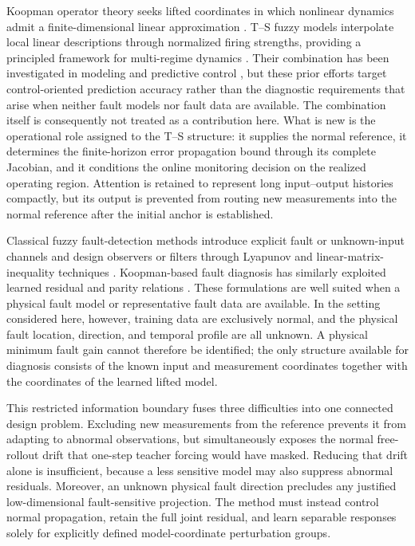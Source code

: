 \documentclass[journal]{IEEEtran}
\newcommand{\1}{\bm 1}
\begin{document}
Koopman operator theory seeks lifted coordinates in which nonlinear dynamics
admit a finite-dimensional linear approximation
\cite{brunton2016,lusch2018}. T--S fuzzy models interpolate local linear
descriptions through normalized firing strengths, providing a principled
framework for multi-regime dynamics \cite{takagi1985,tanaka2001,lam2018}.
Their combination has been investigated in modeling and predictive control
\cite{hu2026}, but these prior efforts target control-oriented prediction
accuracy rather than the diagnostic requirements that arise when neither fault
models nor fault data are available. The combination itself is consequently not
treated as a contribution here. What is new is the operational role assigned to
the T--S structure: it supplies the normal reference, it determines the
finite-horizon error propagation bound through its complete Jacobian, and it
conditions the online monitoring decision on the realized operating region.
Attention is retained to represent long input--output histories compactly, but
its output is prevented from routing new measurements into the normal reference
after the initial anchor is established.

Classical fuzzy fault-detection methods introduce explicit fault or
unknown-input channels and design observers or filters through Lyapunov and
linear-matrix-inequality techniques
\cite{nguang2007,yang2011,thumati2014,zhao2020,ran2022}.
Koopman-based fault diagnosis has similarly exploited learned residual and
parity relations \cite{bakhtiaridoust2023,irani2024}. These formulations are
well suited when a physical fault model or representative fault data are
available. In the setting considered here, however, training data are
exclusively normal, and the physical fault location, direction, and temporal
profile are all unknown. A physical minimum fault gain cannot therefore be
identified; the only structure available for diagnosis consists of the known
input and measurement coordinates together with the coordinates of the learned
lifted model.

This restricted information boundary fuses three difficulties into one
connected design problem. Excluding new measurements from the reference
prevents it from adapting to abnormal observations, but simultaneously exposes
the normal free-rollout drift that one-step teacher forcing would have masked.
Reducing that drift alone is insufficient, because a less sensitive model may
also suppress abnormal residuals. Moreover, an unknown physical fault direction
precludes any justified low-dimensional fault-sensitive projection. The method
must instead control normal propagation, retain the full joint residual, and
learn separable responses solely for explicitly defined model-coordinate
perturbation groups.
\end{document}
